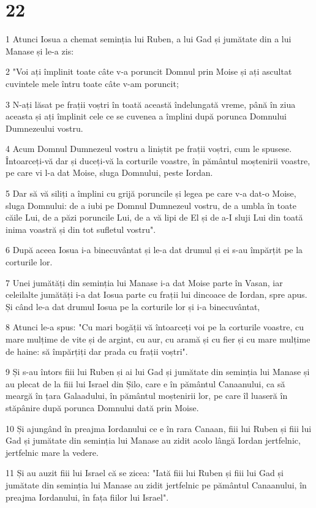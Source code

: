 \chapter{22}

\par 1 Atunci Iosua a chemat seminția lui Ruben, a lui Gad și jumătate din a lui Manase și le-a zis:
\par 2 "Voi ați împlinit toate câte v-a poruncit Domnul prin Moise și ați ascultat cuvintele mele întru toate câte v-am poruncit;
\par 3 N-ați lăsat pe frații voștri în toată această îndelungată vreme, până în ziua aceasta și ați împlinit cele ce se cuvenea a împlini după porunca Domnului Dumnezeului vostru.
\par 4 Acum Domnul Dumnezeul vostru a liniștit pe frații voștri, cum le spusese. Întoarceți-vă dar și duceți-vă la corturile voastre, în pământul moștenirii voastre, pe care vi l-a dat Moise, sluga Domnului, peste Iordan.
\par 5 Dar să vă siliți a împlini cu grijă poruncile și legea pe care v-a dat-o Moise, sluga Domnului: de a iubi pe Domnul Dumnezeul vostru, de a umbla în toate căile Lui, de a păzi poruncile Lui, de a vă lipi de El și de a-I sluji Lui din toată inima voastră și din tot sufletul vostru".
\par 6 După aceea Iosua i-a binecuvântat și le-a dat drumul și ei s-au împărțit pe la corturile lor.
\par 7 Unei jumătăți din seminția lui Manase i-a dat Moise parte în Vasan, iar celeilalte jumătăți i-a dat Iosua parte cu frații lui dincoace de Iordan, spre apus. Și când le-a dat drumul Iosua pe la corturile lor și i-a binecuvântat,
\par 8 Atunci le-a spus: "Cu mari bogății vă întoarceți voi pe la corturile voastre, cu mare mulțime de vite și de argint, cu aur, cu aramă și cu fier și cu mare mulțime de haine: să împărțiți dar prada cu frații voștri".
\par 9 Și s-au întors fiii lui Ruben și ai lui Gad și jumătate din seminția lui Manase și au plecat de la fiii lui Israel din Șilo, care e în pământul Canaanului, ca să meargă în țara Galaadului, în pământul moștenirii lor, pe care îl luaseră în stăpânire după porunca Domnului dată prin Moise.
\par 10 Și ajungând în preajma Iordanului ce e în rara Canaan, fiii lui Ruben și fiii lui Gad și jumătate din seminția lui Manase au zidit acolo lângă Iordan jertfelnic, jertfelnic mare la vedere.
\par 11 Și au auzit fiii lui Israel că se zicea: "Iată fiii lui Ruben și fiii lui Gad și jumătate din seminția lui Manase au zidit jertfelnic pe pământul Canaanului, în preajma Iordanului, în fața fiilor lui Israel".

